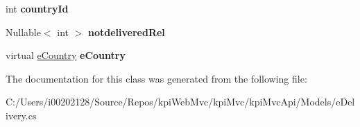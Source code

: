 \begin{DoxyCompactItemize}
int {\bfseries country\+Id}
\item 
\mbox{\label{classkpi_mvc_api_1_1_models_1_1e_delivery_a008a94aecbb8b3262033f8f1baaf3783}} 
Nullable$<$ int $>$ {\bfseries notdelivered\+Rel}
\item 
\mbox{\label{classkpi_mvc_api_1_1_models_1_1e_delivery_afa5e4760b557faeda41e1424dd2b57d4}} 
virtual \hyperlink{classkpi_mvc_api_1_1_models_1_1e_country}{e\+Country} {\bfseries e\+Country}
\end{DoxyCompactItemize}


The documentation for this class was generated from the following file\+:\begin{DoxyCompactItemize}
\item 
C\+:/\+Users/i00202128/\+Source/\+Repos/kpi\+Web\+Mvc/kpi\+Mvc/kpi\+Mvc\+Api/\+Models/e\+Delivery.\+cs\end{DoxyCompactItemize}
